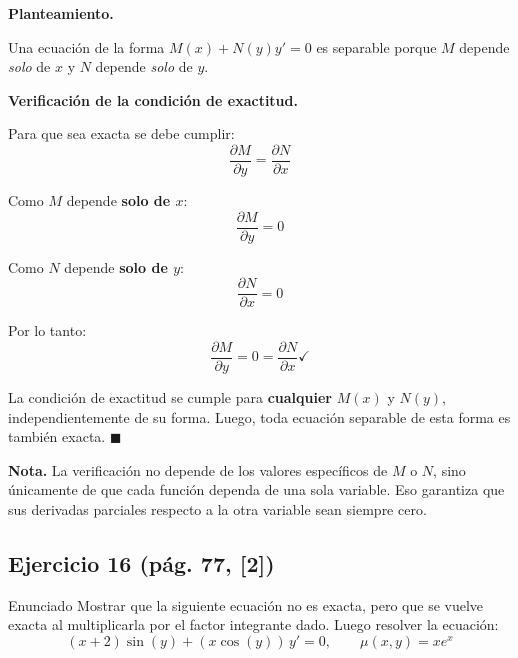 \begin{respuesta}

\textbf{Planteamiento.}

Una ecuación de la forma $M(x) + N(y)y' = 0$ es separable porque 
$M$ depende \textit{solo} de $x$ y $N$ depende \textit{solo} de $y$.

\medskip
\textbf{Verificación de la condición de exactitud.}

Para que sea exacta se debe cumplir:
\[
    \frac{\partial M}{\partial y} = \frac{\partial N}{\partial x}
\]

Como $M$ depende \textbf{solo de $x$}:
\[
    \frac{\partial M}{\partial y} = 0
\]

Como $N$ depende \textbf{solo de $y$}:
\[
    \frac{\partial N}{\partial x} = 0
\]

Por lo tanto:
\[
    \frac{\partial M}{\partial y} = 0 = \frac{\partial N}{\partial x} \checkmark
\]

La condición de exactitud se cumple para \textbf{cualquier} $M(x)$ 
y $N(y)$, independientemente de su forma. Luego, toda ecuación 
separable de esta forma es también exacta. $\blacksquare$

\medskip
\textbf{Nota.} La verificación no depende de los valores específicos 
de $M$ o $N$, sino únicamente de que cada función dependa de una 
sola variable. Eso garantiza que sus derivadas parciales respecto 
a la otra variable sean siempre cero.

\end{respuesta}
\subsection*{Ejercicio 16 \quad\normalfont\small(pág. 77, [2])}
\begin{enunciado}{Enunciado}
    Mostrar que la siguiente ecuación no es exacta, pero que se 
    vuelve exacta al multiplicarla por el factor integrante dado.
    Luego resolver la ecuación:
    \[
        (x + 2)\sin(y) + (x\cos(y))\,y' = 0, 
        \qquad \mu(x,y) = xe^x
    \]
\end{enunciado}

